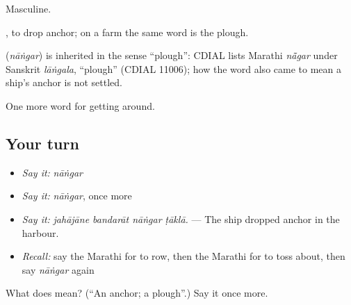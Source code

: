 Masculine.

 , to drop anchor; on a farm the same word is the plough.

\begin{cousinweb}
\textbf{} (\emph{nāṅgar}) is inherited in the sense \textquotedblleft{}plough\textquotedblright{}: CDIAL lists Marathi \emph{nā̃gar} under Sanskrit \emph{lāṅgala}, \textquotedblleft{}plough\textquotedblright{} (CDIAL 11006); how the word also came to mean a ship's anchor is not settled.
\end{cousinweb}

\begin{grammarlens}[title={What you've built}]
One more word for getting around.
\end{grammarlens}

\subsection*{Your turn}
\begin{itemize}
\raggedright
  \item \emph{Say it:} \emph{nāṅgar}
  \item \emph{Say it:} \emph{nāṅgar}, once more
  \item \emph{Say it:} \emph{jahājāne bandarāt nāṅgar ṭāklā.} — The ship dropped anchor in the harbour.
  \item \emph{Recall:} say the Marathi for to row, then the Marathi for to toss about, then say \emph{nāṅgar} again
\end{itemize}

\begin{tcolorbox}[breakable,colback=teal!4,colframe=teal!35!black,title={Before you move on}]
What does  mean? (\textquotedblleft{}An anchor; a plough\textquotedblright{}.) Say it once more.
\end{tcolorbox}
